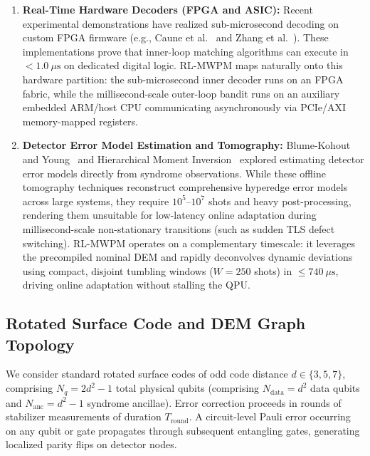 \documentclass[aps,prxquantum,reprint,superscriptaddress,floatfix,nofootinbib]{revtex4-2}
\begin{document}
\begin{enumerate}
    \item \textbf{Real-Time Hardware Decoders (FPGA and ASIC):} Recent experimental demonstrations have realized sub-microsecond decoding on custom FPGA firmware (e.g., Caune et al.~\cite{caune2024real} and Zhang et al.~\cite{zhang2026submicrosecond}). These implementations prove that inner-loop matching algorithms can execute in $<1.0\ \mu\text{s}$ on dedicated digital logic. RL-MWPM maps naturally onto this hardware partition: the sub-microsecond inner decoder runs on an FPGA fabric, while the millisecond-scale outer-loop bandit runs on an auxiliary embedded ARM/host CPU communicating asynchronously via PCIe/AXI memory-mapped registers.
    \item \textbf{Detector Error Model Estimation and Tomography:} Blume-Kohout and Young~\cite{blumekohout2025dem} and Hierarchical Moment Inversion~\cite{hierarchical2026moment} explored estimating detector error models directly from syndrome observations. While these offline tomography techniques reconstruct comprehensive hyperedge error models across large systems, they require $10^5\text{--}10^7$ shots and heavy post-processing, rendering them unsuitable for low-latency online adaptation during millisecond-scale non-stationary transitions (such as sudden TLS defect switching). RL-MWPM operates on a complementary timescale: it leverages the precompiled nominal DEM and rapidly deconvolves dynamic deviations using compact, disjoint tumbling windows ($W=250$ shots) in $\le 740\ \mu\text{s}$, driving online adaptation without stalling the QPU.
\end{enumerate}

\subsection{Rotated Surface Code and DEM Graph Topology}
We consider standard rotated surface codes of odd code distance $d \in \{3, 5, 7\}$, comprising $N_q = 2d^2 - 1$ total physical qubits (comprising $N_{\text{data}} = d^2$ data qubits and $N_{\text{anc}} = d^2 - 1$ syndrome ancillae). Error correction proceeds in rounds of stabilizer measurements of duration $T_{\text{round}}$. A circuit-level Pauli error occurring on any qubit or gate propagates through subsequent entangling gates, generating localized parity flips on detector nodes.
\end{document}
